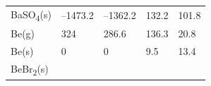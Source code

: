 \documentclass[
  9pt,
]{extbook}
\theoremstyle{definition}
\theoremstyle{definition}
\theoremstyle{definition}
\theoremstyle{remark}
\begin{document}
\begin{longtable}[]{@{}lllll@{}}
\begin{minipage}[t]{0.10\columnwidth}
BaSO\textsubscript{4}(s)\strut
\end{minipage} & \begin{minipage}[t]{0.19\columnwidth}\raggedright
--1473.2\strut
\end{minipage} & \begin{minipage}[t]{0.20\columnwidth}\raggedright
--1362.2\strut
\end{minipage} & \begin{minipage}[t]{0.18\columnwidth}\raggedright
132.2\strut
\end{minipage} & \begin{minipage}[t]{0.18\columnwidth}\raggedright
101.8\strut
\end{minipage}\tabularnewline
\begin{minipage}[t]{0.10\columnwidth}\raggedright
Be(g)\strut
\end{minipage} & \begin{minipage}[t]{0.19\columnwidth}\raggedright
324\strut
\end{minipage} & \begin{minipage}[t]{0.20\columnwidth}\raggedright
286.6\strut
\end{minipage} & \begin{minipage}[t]{0.18\columnwidth}\raggedright
136.3\strut
\end{minipage} & \begin{minipage}[t]{0.18\columnwidth}\raggedright
20.8\strut
\end{minipage}\tabularnewline
\begin{minipage}[t]{0.10\columnwidth}\raggedright
Be(s)\strut
\end{minipage} & \begin{minipage}[t]{0.19\columnwidth}\raggedright
0\strut
\end{minipage} & \begin{minipage}[t]{0.20\columnwidth}\raggedright
0\strut
\end{minipage} & \begin{minipage}[t]{0.18\columnwidth}\raggedright
9.5\strut
\end{minipage} & \begin{minipage}[t]{0.18\columnwidth}\raggedright
13.4\strut
\end{minipage}\tabularnewline
\begin{minipage}[t]{0.10\columnwidth}\raggedright
BeBr\textsubscript{2}(s)\strut
\end{minipage} & \begin{minipage}[t]{0.19\columnwidth}\raggedright

\end{minipage}
\end{longtable}
\end{document}
